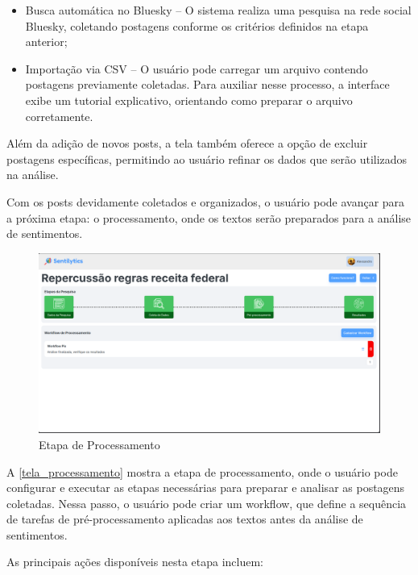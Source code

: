 \documentclass[
	12pt,				%
	oneside,			%
	a4paper,			%
	english,			%
	french,				%
	spanish,			%
	brazil				%
	]{abntex2}
\begin{document}
\begin{itemize}
\tightlist
\item
  Busca automática no Bluesky -- O sistema realiza uma pesquisa na rede
  social Bluesky, coletando postagens conforme os critérios definidos na
  etapa anterior;
\item
  Importação via CSV -- O usuário pode carregar um arquivo contendo
  postagens previamente coletadas. Para auxiliar nesse processo, a
  interface exibe um tutorial explicativo, orientando como preparar o
  arquivo corretamente.
\end{itemize}

Além da adição de novos posts, a tela também oferece a opção de excluir
postagens específicas, permitindo ao usuário refinar os dados que serão
utilizados na análise.

Com os posts devidamente coletados e organizados, o usuário pode avançar
para a próxima etapa: o processamento, onde os textos serão preparados
para a análise de sentimentos.

\begin{figure}[htbp]
\hypertarget{tela_processamento}{%
\caption{Etapa de Processamento}\label{tela_processamento}
\begin{center}
\includegraphics[scale=0.2]{imagens/sentilytics/interface-grafica/processamento.png}
\end{center}
}
\end{figure}

A \autoref{tela_processamento} mostra a etapa de processamento, onde o
usuário pode configurar e executar as etapas necessárias para preparar e
analisar as postagens coletadas. Nessa passo, o usuário pode criar um
workflow, que define a sequência de tarefas de pré-processamento
aplicadas aos textos antes da análise de sentimentos.

As principais ações disponíveis nesta etapa incluem:
\end{document}
